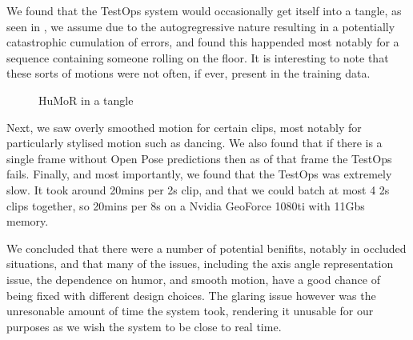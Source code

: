 We found that the TestOps system would occasionally get itself into a tangle, as seen in , we assume due to the autogregressive nature resulting in a potentially catastrophic cumulation of errors, and found this happended most notably for a sequence containing someone rolling on the floor. It is interesting to note that these sorts of motions were not often, if ever, present in the training data.

\begin{figure}[h!]
    \centering
    \hfil
    \hfil
    \caption{HuMoR in a tangle}
    \label{fig:humor_bad_mess}
\end{figure}

Next, we saw overly smoothed motion for certain clips, most notably for particularly stylised motion such as dancing.  We also found that if there is a single frame without Open Pose predictions then as of that frame the TestOps fails. Finally, and most importantly, we found that the TestOps was extremely slow. It took around 20mins per 2s clip, and that we could batch at most 4 2s clips together, so 20mins per 8s on a Nvidia GeoForce 1080ti with 11Gbs memory.

We concluded that there were a number of potential benifits, notably in occluded situations, and that many of the issues, including the axis angle representation issue, the dependence on humor, and smooth motion, have a good chance of being fixed with different design choices.  The glaring issue however was the unresonable amount of time the system took, rendering it unusable for our purposes as we wish the system to be close to real time.

